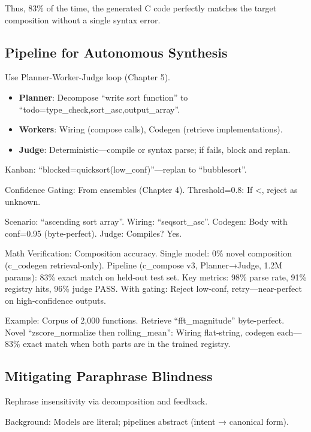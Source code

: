 \documentclass[
]{article}
\providecommand{\tightlist}{%
  \setlength{\itemsep}{0pt}\setlength{\parskip}{0pt}}
\begin{document}
Thus, 83\% of the time, the generated C code perfectly matches the
target composition without a single syntax error.

\subsection{Pipeline for Autonomous
Synthesis}\label{pipeline-for-autonomous-synthesis}

Use Planner-Worker-Judge loop (Chapter 5).

\begin{itemize}
\tightlist
\item
  \textbf{Planner}: Decompose ``write sort function'' to
  ``todo=type\_check,sort\_asc,output\_array''.
\item
  \textbf{Workers}: Wiring (compose calls), Codegen (retrieve
  implementations).
\item
  \textbf{Judge}: Deterministic---compile or syntax parse; if fails,
  block and replan.
\end{itemize}

Kanban: ``blocked=quicksort(low\_conf)''---replan to ``bubblesort''.

Confidence Gating: From ensembles (Chapter 4). Threshold=0.8: If
\textless, reject as unknown.

Scenario: ``ascending sort array''. Wiring: ``seq\textbar sort\_asc''.
Codegen: Body with conf=0.95 (byte-perfect). Judge: Compiles? Yes.

Math Verification: Composition accuracy. Single model: 0\% novel
composition (c\_codegen retrieval-only). Pipeline (c\_compose v3,
Planner→Judge, 1.2M params): 83\% exact match on held-out test set. Key
metrics: 98\% parse rate, 91\% registry hits, 96\% judge PASS. With
gating: Reject low-conf, retry---near-perfect on high-confidence
outputs.

Example: Corpus of 2,000 functions. Retrieve ``fft\_magnitude''
byte-perfect. Novel ``zscore\_normalize then rolling\_mean'': Wiring
flat-string, codegen each---83\% exact match when both parts are in the
trained registry.

\subsection{Mitigating Paraphrase
Blindness}\label{mitigating-paraphrase-blindness}

Rephrase insensitivity via decomposition and feedback.

Background: Models are literal; pipelines abstract (intent → canonical
form).
\end{document}
